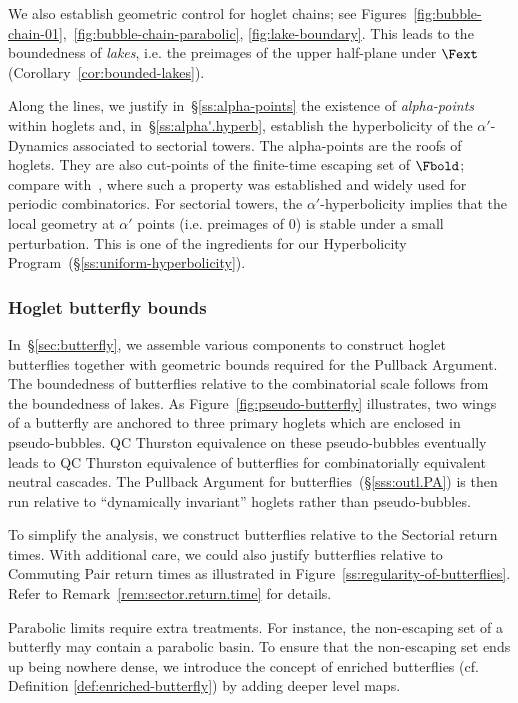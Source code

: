 \documentclass{amsart}
\begin{document}
We also establish geometric control for hoglet chains; see Figures~\ref{fig:bubble-chain-01},~\ref{fig:bubble-chain-parabolic}, \ref{fig:lake-boundary}. This leads to the boundedness of \emph{lakes}, 
i.e. the preimages of the upper half-plane under $\Fext$ (Corollary~\ref{cor:bounded-lakes}).

Along the lines, we justify in~\S\ref{ss:alpha-points} the existence of {\em alpha-points} within hoglets and, in~\S\ref{ss:alpha'.hyperb}, establish the hyperbolicity of the $\alpha'$-Dynamics associated to sectorial towers. The alpha-points are the roofs of hoglets. They are also cut-points of the finite-time escaping set of $\Fbold$; compare with~\cite{DLy23}, where such a property was established and widely used for periodic combinatorics. For sectorial towers, the $\alpha'$-hyperbolicity implies that the local geometry at $\alpha'$ points (i.e. preimages of $0$) is stable under a small perturbation. This is one of the ingredients for our 
Hyperbolicity Program~(\S\ref{ss:uniform-hyperbolicity}). 

\subsubsection{Hoglet butterfly bounds}\label{sss:outl.HogletBounds} In~\S\ref{sec:butterfly}, we assemble various components to construct hoglet butterflies together with geometric bounds required for the Pullback Argument. The boundedness of butterflies relative to the combinatorial scale follows from the boundedness of lakes. As Figure~\ref{fig:pseudo-butterfly} illustrates, two wings of a butterfly are anchored to three primary hoglets which are enclosed in pseudo-bubbles. QC Thurston equivalence on these pseudo-bubbles eventually leads to QC Thurston equivalence of butterflies for combinatorially equivalent neutral cascades. The Pullback Argument for butterflies~(\S\ref{sss:outl.PA}) is then run relative to ``dynamically invariant'' hoglets rather than pseudo-bubbles.

To simplify the analysis, we construct butterflies relative to the Sectorial return times. With additional care, we could also justify butterflies relative to Commuting Pair return times as illustrated in Figure~\ref{ss:regularity-of-butterflies}. Refer to Remark~\ref{rem:sector.return.time} for details.

Parabolic limits require extra treatments. For instance, the non-escaping set of a butterfly may contain a parabolic basin. To ensure that the non-escaping set ends up being nowhere dense, we introduce the concept of enriched butterflies (cf. Definition \ref{def:enriched-butterfly}) by adding deeper level maps.
\end{document}
